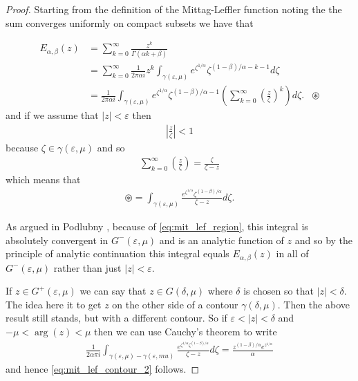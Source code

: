 \begin{proof}
    Starting from the definition of the Mittag-Leffler function noting the the sum converges uniformly on compact subsets we have that
    
    \begin{align*}
	E_{\alpha, \beta}(z) &= \sum_{k=0}^\infty \frac{z^k}{\Gamma(\alpha k + \beta)} \\
	    &= \sum_{k=0}^\infty \frac{1}{2\pi\alpha i} z^k \int_{\gamma(\varepsilon, \mu)} e^{\zeta^{1 / \alpha}} \zeta^{(1-\beta)/\alpha - k - 1} d\zeta \\
	&= \frac{1}{2 \pi \alpha i}  \int_{\gamma(\varepsilon, \mu)} e^{\zeta^{1 / \alpha}} \zeta^{(1-\beta)/\alpha - 1} \left(\sum_{k=0}^\infty \left( \frac{z}{\zeta}\right)^k \right) d\zeta. & \circledast
   \end{align*}
and if we assume that $ |z| < \varepsilon $ then
\begin{align*}
    \left| \frac{z}{\zeta}\right| < 1
\end{align*}
because $ \zeta \in \gamma(\varepsilon, \mu) $ and so
\begin{align*}
   \sum_{k=0}^\infty \left( \frac{z}{\zeta} \right) = \frac{\zeta}{\zeta - z}
\end{align*}
which means that
\begin{align*}
    \circledast = \int_{\gamma(\varepsilon, \mu)} \frac{e^{\zeta^{1 / \alpha}}\zeta^{(1-\beta)/\alpha}}{\zeta - z} d\zeta.
\end{align*}

As argued in Podlubny \cite{Podlubny1999}, because of \ref{eq:mit_lef_region}, this integral is absolutely convergent in $G^-(\varepsilon, \mu) $ and is an analytic function of $ z $ and so by the principle of analytic continuation this integral equals $ E_{\alpha, \beta}(z) $ in all of $ G^-(\varepsilon, \mu) $ rather than just $ |z| < \varepsilon $.

If $ z \in G^+(\varepsilon, \mu) $ we can say that $ z \in G(\delta, \mu) $ where $ \delta $ is chosen so that $ |z| < \delta $. The idea here it to get $ z $ on the other side of a contour $ \gamma(\delta, \mu) $.
Then the above result still stands, but with a different contour. So if $ \varepsilon < |z| <\delta $ and $ -\mu < \arg(z) < \mu $ then we can use Cauchy's theorem to write
\begin{align*}
    \frac{1}{2\alpha \pi i} \int_{\gamma(\varepsilon, \mu) - \gamma(\varepsilon, mu)} \frac{e^{\zeta^{1 / \alpha} \zeta^{(1-\beta)/\alpha}}}{\zeta - z} d \zeta = \frac{z^{(1-\beta)/\alpha} e^{z^{1/\alpha}}}{\alpha}
\end{align*}
and hence \ref{eq:mit_lef_contour_2} follows.
\end{proof}

